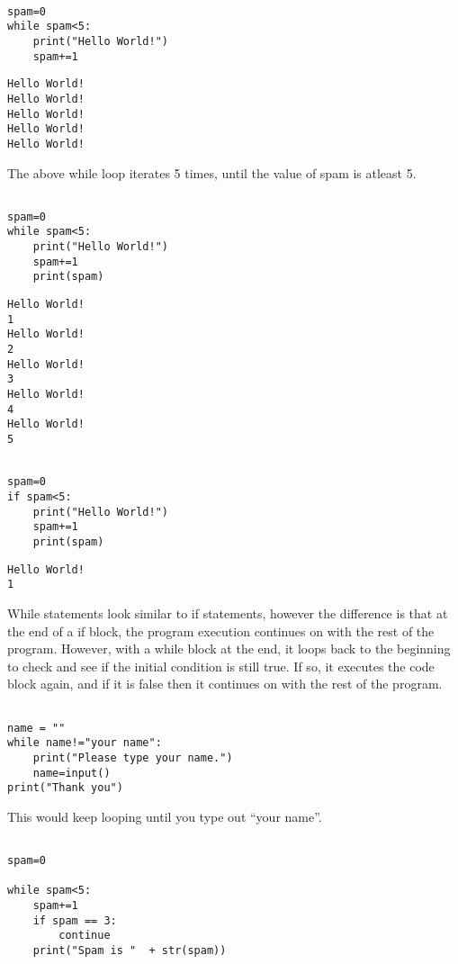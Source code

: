 \documentclass[11pt]{article}
\begin{document}
\begin{verbatim}

spam=0
while spam<5:
    print("Hello World!")
    spam+=1

\end{verbatim}

\begin{verbatim}
Hello World!
Hello World!
Hello World!
Hello World!
Hello World!
\end{verbatim}


The above while loop iterates 5 times, until the value of spam is atleast 5.

\begin{verbatim}

spam=0
while spam<5:
    print("Hello World!")
    spam+=1
    print(spam)

\end{verbatim}

\begin{verbatim}
Hello World!
1
Hello World!
2
Hello World!
3
Hello World!
4
Hello World!
5
\end{verbatim}


\begin{verbatim}

spam=0
if spam<5:
    print("Hello World!")
    spam+=1
    print(spam)

\end{verbatim}

\begin{verbatim}
Hello World!
1
\end{verbatim}


While statements look similar to if statements, however the difference is that at the end of a if block, the program execution continues on with the rest of the program. However, with a while block at the end, it loops back to the beginning to check and see if the initial condition is still true. If so, it executes the code block again, and if it is false then it continues on with the rest of the program.


\begin{verbatim}

name = ""
while name!="your name":
    print("Please type your name.")
    name=input()
print("Thank you")

\end{verbatim}

This would keep looping until you type out ``your name''.

\begin{verbatim}

spam=0

while spam<5:
    spam+=1
    if spam == 3:
        continue
    print("Spam is "  + str(spam))

\end{verbatim}
\end{document}
